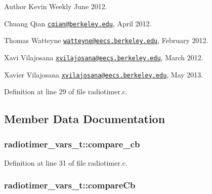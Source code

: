 \begin{DoxyAuthor}{Author}
Kevin Weekly June 2012.

Chuang Qian \href{mailto:cqian@berkeley.edu}{\tt cqian@berkeley.\+edu}, April 2012.

Thomas Watteyne \href{mailto:watteyne@eecs.berkeley.edu}{\tt watteyne@eecs.\+berkeley.\+edu}, February 2012.

Xavi Vilajosana \href{mailto:xvilajosana@eecs.berkeley.edu}{\tt xvilajosana@eecs.\+berkeley.\+edu}, March 2012.

Xavier Vilajosana \href{mailto:xvilajosana@eecs.berkeley.edu}{\tt xvilajosana@eecs.\+berkeley.\+edu}, May 2013. 
\end{DoxyAuthor}


Definition at line 29 of file radiotimer.\+c.



\subsection{Member Data Documentation}
\subsubsection[{\texorpdfstring{compare\+\_\+cb}{compare_cb}}]{ radiotimer\+\_\+vars\+\_\+t\+::compare\+\_\+cb}\hypertarget{structradiotimer__vars__t_a2aa018ea64804baa337d825420f2f7d6}{}\label{structradiotimer__vars__t_a2aa018ea64804baa337d825420f2f7d6}


Definition at line 31 of file radiotimer.\+c.

\subsubsection[{\texorpdfstring{compare\+Cb}{compareCb}}]{ radiotimer\+\_\+vars\+\_\+t\+::compare\+Cb}\hypertarget{structradiotimer__vars__t_a7acaf4a34fe5cdb1411d3ff5fd07023c}{}\label{structradiotimer__vars__t_a7acaf4a34fe5cdb1411d3ff5fd07023c}


